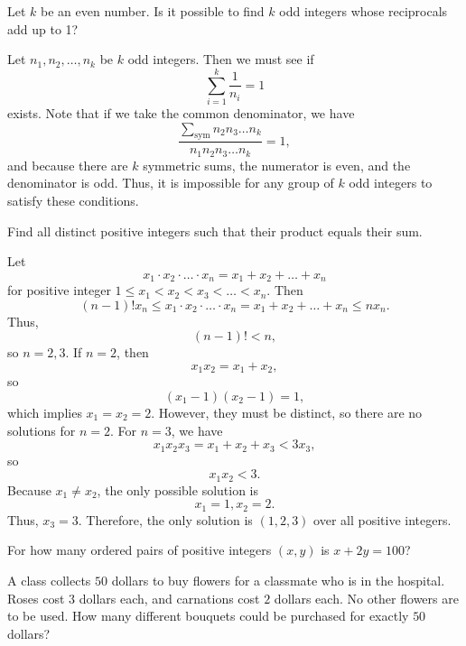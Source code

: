 \documentclass{article}
\begin{document}
\begin{exam}
Let $k$ be an even number. Is it possible to find $k$ odd integers whose reciprocals add up to 1?
\end{exam}
\begin{sol}
Let $n_1,n_2,\ldots,n_k$ be $k$ odd integers. Then we must see if
$$\sum_{i=1}^k \frac{1}{n_i} = 1$$
exists. Note that if we take the common denominator, we have
$$\frac{\sum_{\text{sym}} n_2n_3\ldots n_k}{n_1n_2n_3\ldots n_k} = 1,$$
and because there are $k$ symmetric sums, the numerator is even, and the denominator is odd. Thus, it is impossible for any group of $k$ odd integers to satisfy these conditions.
\end{sol}
\begin{exam}
Find all distinct positive integers such that their product equals their sum.
\end{exam}
\begin{sol}
Let
$$x_1 \cdot x_2 \cdot \ldots \cdot x_n = x_1 + x_2 + \ldots + x_n$$
for positive integer $1\le x_1 < x_2 < x_3 < \ldots < x_n$. Then
$$(n-1)! x_n \le x_1 \cdot x_2 \cdot \ldots \cdot x_n = x_1 + x_2 + \ldots + x_n \le nx_n.$$
Thus,
$$(n-1)! < n,$$
so $n=2,3$. If $n=2$, then
$$x_1x_2 = x_1 + x_2,$$
so
$$(x_1-1)(x_2-1) = 1,$$
which implies $x_1=x_2=2$. However, they must be distinct, so there are no solutions for $n=2$. For $n=3$, we have
$$x_1x_2x_3 = x_1+x_2+x_3<3x_3,$$
so
$$x_1x_2<3.$$
Because $x_1 \neq x_2$, the only possible solution is
$$x_1=1,x_2=2.$$
Thus, $x_3=3$. Therefore, the only solution is $(1,2,3)$ over all positive integers.
\end{sol}
\problems
{}


\begin{prob}[AMC 12A 2004/3]{1}

For how many ordered pairs of positive integers $(x,y)$ is $x+2y=100$?

\end{prob}

\begin{prob}[AMC 12B 2008/5]{1}

A class collects $50$ dollars to buy flowers for a classmate who is in the hospital. Roses cost $3$ dollars each, and carnations cost $2$ dollars each. No other flowers are to be used. How many different bouquets could be purchased for exactly $50$ dollars?

\end{prob}
\end{document}
